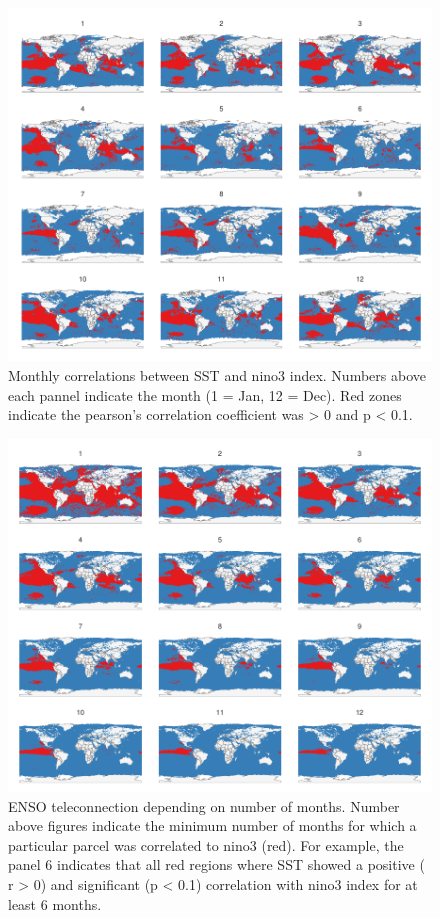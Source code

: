 \documentclass[]{article}
\begin{document}
\begin{figure}
\centering
\includegraphics{Oremus_Villasenor-Derbez_files/figure-latex/unnamed-chunk-9-1.pdf}
\caption{Monthly correlations between SST and nino3 index. Numbers above
each pannel indicate the month (1 = Jan, 12 = Dec). Red zones indicate
the pearson's correlation coefficient was \textgreater{} 0 and p
\textless{} 0.1.}
\end{figure}

\begin{figure}
\centering
\includegraphics{Oremus_Villasenor-Derbez_files/figure-latex/unnamed-chunk-10-1.pdf}
\caption{ENSO teleconnection depending on number of months. Number above
figures indicate the minimum number of months for which a particular
parcel was correlated to nino3 (red). For example, the panel 6 indicates
that all red regions where SST showed a positive ( r \textgreater{} 0)
and significant (p \textless{} 0.1) correlation with nino3 index for at
least 6 months.}
\end{figure}
\end{document}
